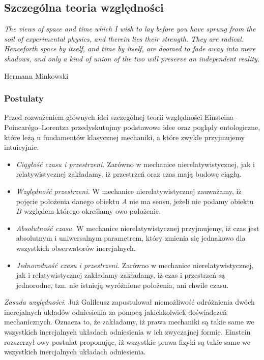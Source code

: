 \documentclass[../main.tex]{subfiles}
\begin{document}
  \subsection{Szczególna teoria względności}
        \textit{The views of space and time which I wish to lay before you have sprung from the soil of experimental physics, and therein lies their strength. They are radical. Henceforth space by itself, and time by itself, are doomed to fade away into mere shadows, and only a kind of union of the two will preserve an independent reality.}\begin{flushright}Hermann Minkowski\end{flushright}

\subsubsection{Postulaty}
Przed rozważeniem głównych idei szczególnej teorii względności Einsteina--Poincarégo--Lorentza przedyskutujmy podstawowe idee oraz poglądy ontologiczne, które leżą u fundamentów klasycznej mechaniki, a które zwykle przyjmujemy intuicyjnie.
\begin{itemize}
    \item \textit{Ciągłość czasu i przestrzeni.} Zarówno w mechanice nierelatywistycznej, jak i relatywistycznej zakładamy, iż przestrzeń oraz czas mają budowę ciągłą.
    \item \textit{Względność przestrzeni.} W mechanice nierelatywistycznej zauważamy, iż pojęcie położenia danego obiektu \(A\) nie ma sensu, jeżeli nie podamy obiektu  \(B\) względem którego określamy owo położenie.
    \item \textit{Absolutność czasu.} W mechanice nierelatywistycznej przyjmujemy, iż czas jest absolutnym i uniwersalnym parametrem, który zmienia się jednakowo dla wszystkich obserwatorów inercjalnych.
    \item \textit{Jednorodność czasu i przestrzeni.} Zarówno w mechanice nierelatywistycznej, jak i relatywistycznej zakładamy zakładamy, iż czas i przestrzeń są jednorodne, tzn. nie istnieją wyróżnione położenia, ani chwile czasu.
\end{itemize}
\textit{Zasada względności}. Już Galileusz zapostulował niemożliwość odróżnienia dwóch inercjalnych układów odniesienia za pomocą jakichkolwiek doświadczeń mechanicznych. Oznacza to, że zakładamy, iż prawa mechaniki są takie same we wszystkich inercjalnych układach odniesienia w ich zwyczajnej formie. Einstein rozszerzył owy postulat proponując, iż wszystkie prawa fizyki są takie same we wszystkich inercjalnych układach odniesienia.\\
\end{document}
